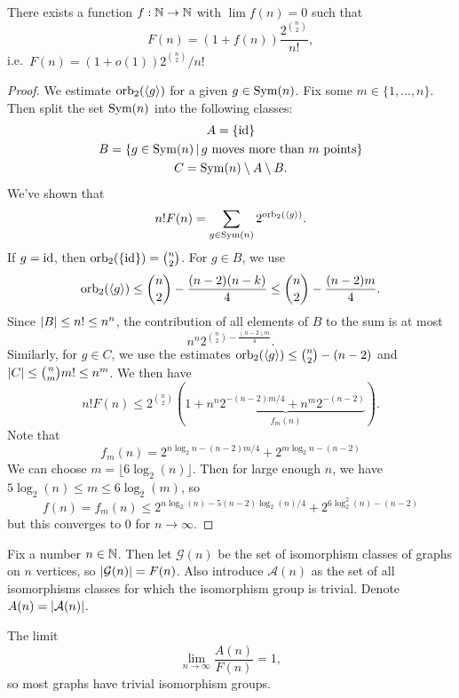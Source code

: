 \begin{theorem}
  There exists a function $f: \mathbb{N} \to \mathbb{N}$ with $\lim f(n) = 0$ such that
  \[
	F(n) = (1 + f(n)) \frac{2^{\binom{n}{2}}}{n!},
  \]
  i.e.~$F(n) = (1 + o(1)) 2^{\binom{n}{2}} / {n!}$
\end{theorem}

\begin{proof}
  We estimate $\operatorname{orb}_2(\left< g \right>)$ for a given $g \in \operatorname{Sym}(n)$.
  Fix some $m \in \{1, \ldots, n\}$.
  Then split the set $\operatorname{Sym}(n)$ into the following classes:
  \begin{gather*}
	A = \{\operatorname{id}\} \\
	B = \{ g \in \operatorname{Sym}(n) \,|\, \text{$g$ moves more than $m$ points} \} \\
	C = \operatorname{Sym}(n) \setminus A \setminus B.
  \end{gather*}
  We've shown that
  \[
	n! F(n) = \sum_{g \in \operatorname{Sym}(n)} 2^{\operatorname{orb}_2(\left< g \right>)}.
  \]
  If $g = \operatorname{id}$, then $\operatorname{orb}_2(\{\operatorname{id}\}) = \binom{n}{2}$.
  For $g \in B$, we use
  \[
	\operatorname{orb}_2(\left< g \right>)
	\le \binom{n}{2} - \frac{(n-2)(n-k)}{4}
	\le \binom{n}{2} - \frac{(n-2) m}{4}.
  \]
  Since $\left| B \right| \le n! \le n^n$, the contribution of all elements of $B$ to the
  sum is at most
  \[
	n^n 2^{\binom{n}{2} - \frac{(n-2)m}{4}}.
  \]
  Similarly, for $g \in C$, we use the estimates $\operatorname{orb}_2(\left< g \right>)
  \le \binom{n}{2} - (n-2)$ and $\left| C \right| \le \binom{n}{m} m! \le n^m$.
  We then have
  \[
	n! F(n) \le 2^{\binom{n}{2}} \left(
	  1 + \underbrace{n^n 2^{\displaystyle -(n-2)m / 4} + n^m 2^{\displaystyle
		  -(n-2)}}_{f_m(n)}
	\right).
  \]
  Note that
  \[
	f_m(n) = 2^{\displaystyle n \log_2 n - (n-2)m / 4} + 2^{\displaystyle m \log_2 n - (n-2)}
  \]
  We can choose $m = \lfloor 6 \log_2(n) \rfloor$.
  Then for large enough $n$, we have $5 \log_2(n) \le m \le 6 \log_2(m)$, so
  \[
	f(n) = f_m(n)
	\le 2^{\displaystyle n \log_2(n) - 5 (n-2) \log_2(n) / 4}
	+ 2^{\displaystyle 6 \log_2^2(n) - (n-2)}
  \]
  but this converges to $0$ for $n \to \infty$.
\end{proof}

Fix a number $n \in \mathbb{N}$.
Then let $\mathcal{G}(n)$ be the set of isomorphism classes of graphs on $n$
vertices, so $\left| \mathcal{G}(n) \right| = F(n)$.
Also introduce $\mathcal{A}(n)$ as the set of all isomorphisms classes for which
the isomorphism group is trivial.
Denote $A(n) = \left| \mathcal{A}(n) \right|$.

\begin{theorem}
  The limit
  \[
	\lim_{n \to \infty} \frac{A(n)}{F(n)} = 1,
  \]
  so most graphs have trivial isomorphism groups.
\end{theorem}

